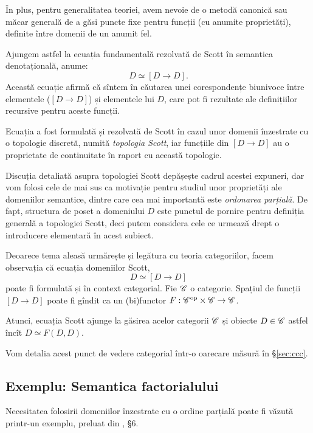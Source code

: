 \documentclass[12pt, a4paper]{article}
\begin{document}
În plus, pentru generalitatea teoriei, avem nevoie de o metodă canonică
sau măcar generală de a găsi puncte fixe pentru funcții (cu anumite proprietăți),
definite între domenii de un anumit fel.

Ajungem astfel la ecuația fundamentală rezolvată de Scott în semantica denotațională,
anume:
\[
  D \simeq [ D \to D ].
\]
Această ecuație afirmă că sîntem în căutarea unei corespondențe biunivoce
între elementele  ($ [D \to D] $) și elementele
lui $ D $, care pot fi rezultate ale definițiilor recursive pentru aceste
funcții.

Ecuația a fost formulată și rezolvată de Scott în cazul unor domenii
înzestrate cu o topologie discretă, numită \emph{topologia Scott}, iar
funcțiile din $ [D \to D] $ au o proprietate de continuitate în
raport cu această topologie.

Discuția detaliată asupra topologiei Scott depășește cadrul acestei
expuneri, dar vom folosi cele de mai sus ca motivație pentru studiul
unor proprietăți ale domeniilor semantice, dintre care cea mai importantă
este \emph{ordonarea parțială}. De fapt, structura de poset a domeniului $ D $
este punctul de pornire pentru definiția generală a topologiei Scott, deci
putem considera cele ce urmează drept o introducere elementară în acest subiect.

\begin{remark}\label{rk:dom-cat}
  Deoarece tema aleasă urmărește și legătura cu teoria categoriilor, facem
  observația că ecuația domeniilor Scott,
  \[
    D \simeq [D \to D]
  \]
  poate fi formulată și în context categorial. Fie $ \mathscr{C} $ o categorie.
  Spațiul de funcții $ [D \to D] $ poate fi gîndit ca un (bi)functor
  $ F : \mathscr{C}^{\text{op}} \times \mathscr{C} \to \mathscr{C} $.

  Atunci, ecuația Scott ajunge la găsirea acelor categorii $ \mathscr{C} $ și obiecte
  $ D \in \mathscr{C} $ astfel încît $ D \simeq F(D, D) $.

  Vom detalia acest punct de vedere categorial într-o oarecare măsură în
  \S\ref{sec:ccc}.
\end{remark}


\subsection{Exemplu: Semantica factorialului}

\indent\indent Necesitatea folosirii domeniilor înzestrate cu o ordine parțială
poate fi văzută printr-un exemplu, preluat din \cite{schm}, \S 6.
\end{document}
